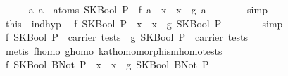 \begin{isabellebody}
\ \ \ \ \isamarkupfalse%
\ {}{}a{}\ a\ {}\ atoms\ {}SKBool\ P{}\ {}\ f\ a\ {}\ x\ {}\ x\ {}\ g\ a{}\isanewline
\ \ \ \ \ \ \isamarkupfalse%
\ simp\isanewline
\ \ \ \ \isamarkupfalse%
\ this\ \ ind{}hyp\ \isamarkupfalse%
\ {}f\ {}SKBool\ P{}\ {}\ x\ {}\ x\ {}\ g\ {}SKBool\ P{}{}\isanewline
\ \ \ \ \ \ \isamarkupfalse%
\ simp\isanewline
\ \ \ \ \isamarkupfalse%
\ \isamarkupfalse%
\ {}f\ {}SKBool\ P{}\ {}\ carrier\ tests{}\ \ {}g\ {}SKBool\ P{}\ {}\ carrier\ tests{}\isanewline
\ \ \ \ \ \ \isamarkupfalse%
\ {}metis\ f{}homo\ g{}homo\ kat{}homomorphism{}homo{}tests{}{}\isanewline
\ \ \ \ \isamarkupfalse%
\ \isamarkupfalse%
\ {}f\ {}SKBool\ {}BNot\ P{}{}\ {}\ x\ {}\ x\ {}\ g\ {}SKBool\ {}BNot\ P{}{}{}\isanewline

\end{isabellebody}
